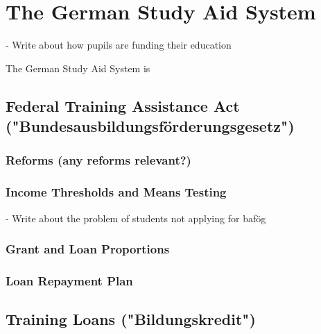 \section{The German Study Aid System} 
\label{section:the-german-study-aid-system}

- Write about how pupils are funding their education 


The German Study Aid System is 

\subsection{Federal Training Assistance Act ("Bundesausbildungsförderungsgesetz") } 
\label{subsection:federal-training-assistance-act}

\subsubsection{Reforms (any reforms relevant?)} 
\label{subsection:reforms}

\subsubsection{Income Thresholds and Means Testing} 
\label{subsection:thresholds}
- Write about the problem of students not applying for bafög

\subsubsection{Grant and Loan Proportions} 
\label{subsection:grant-to-loan-proportion}

\subsubsection{Loan Repayment Plan} 
\label{subsection:loan-repayment-plan}

\subsection{Training Loans ("Bildungskredit")}

